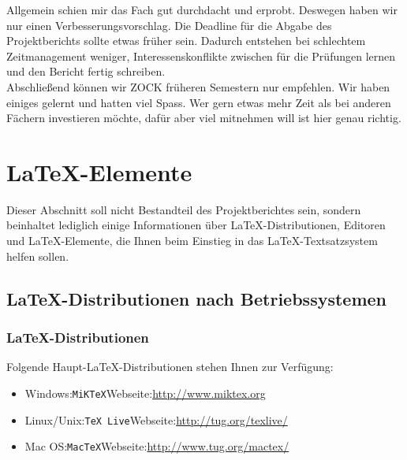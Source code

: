 \documentclass[12pt,a4paper,bibliography=totocnumbered,listof=totocnumbered]{scrartcl}
\begin{document}
	Allgemein schien mir das Fach gut durchdacht und erprobt. Deswegen haben wir nur einen Verbesserungsvorschlag. Die Deadline für die Abgabe des Projektberichts sollte etwas früher sein. Dadurch entstehen bei schlechtem Zeitmanagement weniger, Interessenskonflikte zwischen für die Prüfungen lernen und den Bericht fertig schreiben.\\
	Abschließend können wir \glqq ZOCK \grqq{} früheren Semestern nur empfehlen. Wir haben einiges gelernt und hatten viel Spass. Wer gern etwas mehr Zeit als bei anderen Fächern investieren möchte, dafür aber viel mitnehmen will ist hier genau richtig.

    \newpage
    
    
    \section{\LaTeX-Elemente}
    Dieser Abschnitt soll nicht Bestandteil des Projektberichtes sein, sondern beinhaltet lediglich einige Informationen über \LaTeX-Distributionen, Editoren und \LaTeX-Elemente, die Ihnen beim Einstieg in das \LaTeX-Textsatzsystem helfen sollen.

    \subsection{\LaTeX-Distributionen nach Betriebssystemen}

    \subsubsection{\LaTeX-Distributionen}
    Folgende Haupt-\LaTeX-Distributionen stehen Ihnen zur Verfügung:
    \begin{itemize}
        \item Windows:\quad \texttt{MiKTeX}\quad Webseite:\quad\url{http://www.miktex.org}
        \item Linux/Unix:\quad \texttt{TeX Live}\quad Webseite:\quad\url{http://tug.org/texlive/}
        \item Mac OS:\quad \texttt{MacTeX}\quad Webseite:\quad\url{http://www.tug.org/mactex/}
    \end{itemize}
\end{document}
